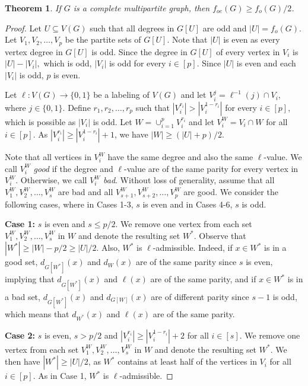 \documentclass{article}
\newcommand{\2}{\vspace{0.2cm}}
\newtheorem{theorem}{Theorem}[section]
\begin{document}
\begin{theorem}
 If $G$ is a complete multipartite graph, then $f_{oe}(G) \geq f_o(G)/2$.
\end{theorem}
\begin{proof}
Let $U \subseteq V(G)$ such that all degrees in $G[U]$ are odd and $|U|=f_o(G)$.  %
Let $V_1,V_2,\ldots,V_p$ be the partite sets of $G[U]$. 
Note that $|U|$ is even as every vertex degree in $G[U]$ is odd. Since the degree in $G[U]$ of every vertex in $V_i$ is $|U|-|V_i|,$ which is odd, $|V_i|$ is odd for every $i \in [p]$. 
Since $|U|$ is even and each $|V_i|$ is odd, $p$ is even. 

Let $\ell : V(G) \rightarrow \{0,1\}$ be a labeling of $V(G)$ and let $V_i^j=\ell^{-1}(j)\cap V_i,$ where $j\in \{0,1\}.$
Define $r_1,r_2,\ldots,r_p$ such that $|V_i^{r_i}| > |V_i^{1-r_i}|$ for every $i \in [p]$, which is possible as $|V_i|$ is odd.
Let $W = \cup_{i=1}^p V_i^{r_i}$ and let $V_i^W = V_i \cap W$ for all $i \in [p]$.
As $|V_i^{r_i}| \geq |V_i^{1-r_i}|+1$, we have $|W| \geq (|U| + p)/2$.

Note that all vertices in $V_i^W$ have the same degree and also the same $\ell$-value. We call $V_i^W$ {\em good} if the degree and $\ell$-value are of the same parity for every vertex in $V_i^W$. Otherwise, we call $V_i^W$ {\em bad}.
Without loss of generality, assume that all $V_1^W,V_2^W,\ldots , V_s^W$ are bad and all $V_{s+1}^W,V_{s+2}^W,\ldots , V_p^W$ are good. 
We consider the following cases, where in Cases 1-3, $s$ is even and in Cases 4-6, $s$ is odd. 

\2

{\bf Case 1:} $s$ is even and $s \leq p/2$. We remove one vertex from each set $V_1^W,V_2^W,\ldots , V_s^W$ in $W$ and denote the resulting set $W^*$. Observe that $|W^*| \geq |W|- p/2 \geq |U| / 2$. Also, $W^*$ is $\ell$-admissible. Indeed, if $x\in W^*$ is in a good set, $d_{G[W^*]}(x)$ and $d_W(x)$ are of the same parity  since $s$ is even, implying that $d_{G[W^*]}(x)$ and $\ell(x)$ are of the same parity, and if $x\in W^*$ is in a bad set, $d_{G[W^*]}(x)$ and $d_{G[W]}(x)$ are of different parity since $s-1$ is odd, which means that $d_{W^*}(x)$ and $\ell(x)$ are of the same parity. 

\2

{\bf Case 2:} $s$ is even, $s > p/2$ and  $|V_i^{r_i}| \geq |V_i^{1-r_i}|+2$ for all $i \in [s]$. 
We remove one vertex from each set $V_1^W,V_2^W,\ldots , V_s^W$ in $W$ and denote the resulting set $W^*$.
We then have $|W^*| \geq |U| / 2$, as $W^*$ contains at least half of the vertices in $V_i$ for all $i \in [p]$. 
As in Case 1, $W^*$ is $\ell$-admissible.


\end{proof}
\end{document}
